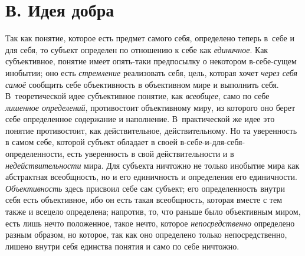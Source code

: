 \section[В. Идея добра]{В. Идея добра}
Так как понятие, которое есть предмет самого себя, определено
теперь в~себе и для себя, то субъект определен по отношению к себе как
{\em единичное}. Как
субъективное, понятие имеет опять-таки предпосылку о некотором в-себе-сущем
инобытии; оно есть {\em стремление}
реализовать себя, цель, которая хочет
{\em через себя самоё}
сообщить себе объективность в объективном мире и выполнить
себя. В~теоретической идее субъективное понятие, как
{\em всеобщее}, само по
себе {\em лишенное определений},
противостоит объективному миру, из которого оно берет себе
определенное содержание и наполнение. В~практической же идее это понятие
противостоит, как действительное, действительному. Но та уверенность в
самом себе, которой субъект обладает в своей
в-себе-и-для-себя-определенности, есть уверенность в свой действительности
и в {\em недействительности}
мира. Для субъекта ничтожно не только инобытие мира как
абстрактная всеобщность, но и его единичность и определения его
единичности. {\em Объективность}
здесь присвоил себе сам субъект; его определенность внутри
себя есть объективное, ибо он есть такая всеобщность, которая вместе с тем
также и всецело определена; напротив, то, что раньше было объективным
миром, есть лишь нечто положенное, такое нечто, которое
{\em непосредственно}
определено разным образом, но которое, так как оно определено
только непосредственно, лишено внутри себя единства понятия и само по себе
ничтожно.

